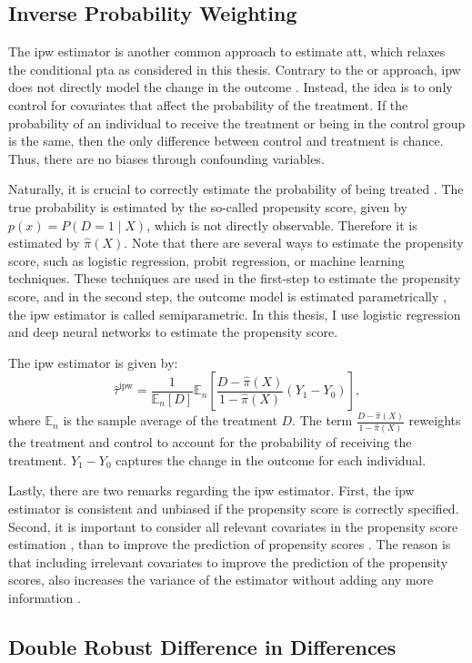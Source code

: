 \subsection{Inverse Probability Weighting}
The \ac{ipw} estimator is another common approach to estimate \ac{att}, which relaxes the conditional \ac{pta} as considered in this thesis.
Contrary to the \ac{or} approach, \ac{ipw} does not directly model the change in the outcome \citep{santannaDoublyRobustDifferenceindifferences2020}.
Instead, the idea is to only control for covariates that affect the probability of the treatment.
If the probability of an individual to receive the treatment or being in the control group is the same, then the only difference between control and treatment is chance.
Thus, there are no biases through confounding variables.

Naturally, it is crucial to correctly estimate the probability of being treated \citep{angrist2009mostly}.
The true probability is estimated by the so-called propensity score, given by $p(x) = P(D=1 \mid X)$, which is not directly observable.
Therefore it is estimated by $\hat{\pi}(X)$.
Note that there are several ways to estimate the propensity score, such as logistic regression, probit regression, or machine learning techniques.
These techniques are used in the first-step to estimate the propensity score, and in the second step, the outcome model is estimated parametrically \citep{abadieSemiparametricDifferenceinDifferencesEstimators2005}, the \ac{ipw} estimator is called semiparametric.
In this thesis, I use logistic regression and deep neural networks to estimate the propensity score.

The \ac{ipw} estimator is given by:
\begin{equation}
\hat{\tau}^{\text{ipw}} = \frac{1}{\mathbb{E}_n[D]} \mathbb{E}_n \left[ \frac{D - \hat{\pi}(X)}{1 - \hat{\pi}(X)} (Y_1 - Y_0) \right],
\label{eq:4}
\end{equation}
where $\mathbb{E}_n$  is the sample average of the treatment $D$.
The term $\frac{D - \hat{\pi}(X)}{1 - \hat{\pi}(X)}$ reweights the treatment and control to account for the probability of receiving the treatment.
$Y_1 - Y_0$ captures the change in the outcome for each individual.


Lastly, there are two remarks regarding the \ac{ipw} estimator.
First, the \ac{ipw} estimator is consistent and unbiased if the propensity score is correctly specified.
Second, it is important to consider all relevant covariates in the propensity score estimation \citep{angrist2009mostly}, than to improve the prediction of propensity scores \citep{hernanCausalInferenceWhat}.
The reason is that including irrelevant covariates to improve the prediction of the propensity scores, also increases the variance of the estimator without adding any more information \citep{hernanCausalInferenceWhat}.
\subsection{Double Robust Difference in Differences}
